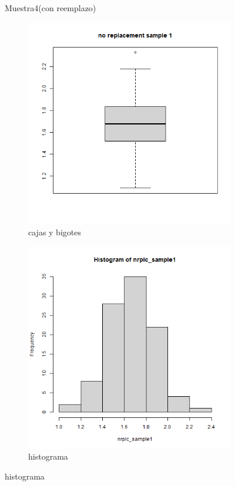 \documentclass[a4paper,12pt]{article}
\begin{document}
\begin{enumerate}
\begin{figure}[t!]
    
    \caption{Muestra4(con reemplazo)}
    \label{figure}
\end{figure}


\begin{figure}[t!]
    \centering
    \begin{subfigure}[b]{0.4\linewidth}             
        \includegraphics[width = \linewidth]{./datos generados (Ejercicio 1)/no_replacement_sample1_boxplot.png}
        \caption{cajas y bigotes}
    \end{subfigure}
    \begin{subfigure}[b]{0.4\linewidth}               
        \includegraphics[width = \linewidth]{./datos generados (Ejercicio 1)/no_replacement_sample1_hist.png}
        \caption{histograma}
    \end{subfigure}


\end{figure}
\end{enumerate}
\end{document}
